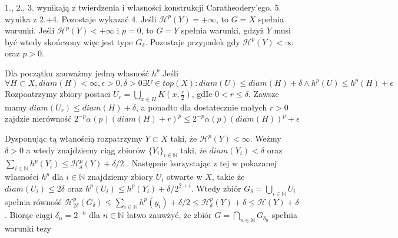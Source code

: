 
1., 2., 3. wynikają z twierdzenia i własności konstrukcji Caratheodery'ego. 5. wynika z 2.+4. Pozostaje wykazać 4.
Jeśli $\mathcal{H}^p(Y) = +\infty$, to $G=X$ spełnia warunki. Jeśli $\mathcal{H}^p(Y) < +\infty$ i $p=0$, to $G=Y$ spełnia warunki, gdzyż $Y$ musi być wtedy skończony więc jest type $G_{\delta}$.
Pozostaje przypadek gdy $\mathcal{H}^p(Y) < \infty$ oraz $p > 0$.\newline

Dla początku zauważmy jedną  własność $h^p$
Jeśli $\forall H \subset X, diam(H) < \infty, \epsilon > 0, \delta> 0 \exists U \in top(X): diam(U) \leq diam(H) + \delta \wedge h^p(U) \leq h^p(H) + \epsilon$ 
Rozpoatrzymy zbiory postaci $U_r = \bigcup_{x \in H} K(x, \frac{r}{2})$, gdIe $0 < r \leq \delta$. Zawsze mamy $diam(U_r) \leq diam(H) + \delta$, a ponadto dla dostatecznie małych $r>0$ zajdzie nierówność $2^{-p} \alpha(p) (diam(H) + r)^p \leq 2^{-p} \alpha(p)(diam(H))^p + \epsilon$ \newline

Dysponując tą włanością rozpatrzymy $Y \subset X$ taki, że $\mathcal{H}^p(Y) < \infty$. Weżmy $\delta > 0$ a wtedy znajdziemy ciąg zbiorów $\{Y_i\}_{i \in \mathbb{N}}$ taki, że $diam(Y_i) < \delta$ oraz $\sum_{i \in \mathbb{N}} h^p(Y_i) \leq \mathcal{H}^p_{\delta}(Y) + \delta/2$  . Następnie korzystając z tej w pokazanej własności $h^p$ dla $i \in \mathbb{N}$ znajdziemy zbiory $U_i$ otwarte w $X$, takie że $diam(U_i) \leq 2 \delta$ oraz $h^p(U_i) \leq h^p(Y_i) + \delta/ 2^{2+i}$. Wtedy zbiór $G_{\delta} = \bigcup_{i \in \mathbb{N}}U_i$ spełnia równość $\mathcal{H}_{2\delta}^p(G_{\delta}) \leq \sum_{i \in \mathbb{N}} h^p(y_i) + \delta/2 \leq \mathcal{H}^p_{\delta}(Y) + \delta \leq \mathcal{H}(Y) + \delta$ .  Biorąc ciągi  $\delta_n = 2^{-n}$ dla $n \in \mathbb{N}$ łatwo zauwżyć, że zbiór $G = \bigcap_{n \in \mathbb{N}} G_{\delta_n}$ spełnia warunki tezy 